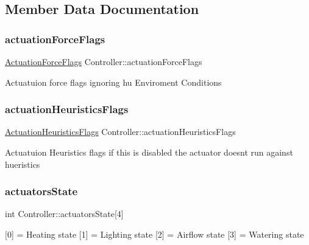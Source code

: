 \subsection{Member Data Documentation}
\mbox{\label{classController_a5af467109ecf31a0e63213ff9e5d0d72}} 
\subsubsection{\texorpdfstring{actuation\+Force\+Flags}{actuationForceFlags}}
{\footnotesize\ttfamily \hyperlink{structActuationForceFlags}{Actuation\+Force\+Flags} Controller\+::actuation\+Force\+Flags}

Actuatuion force flags ignoring hu Enviroment Conditions \mbox{\label{classController_ae3d5121f2fa076d362ac5d56feae17d2}} 
\subsubsection{\texorpdfstring{actuation\+Heuristics\+Flags}{actuationHeuristicsFlags}}
{\footnotesize\ttfamily \hyperlink{structActuationHeuristicsFlags}{Actuation\+Heuristics\+Flags} Controller\+::actuation\+Heuristics\+Flags}

Actuatuion Heuristics flags if this is disabled the actuator doesn\textquotesingle{}t run against hueristics \mbox{\label{classController_a23064d241b70e672c4c1d3db9671bd5e}} 
\subsubsection{\texorpdfstring{actuators\+State}{actuatorsState}}
{\footnotesize\ttfamily int Controller\+::actuators\+State\mbox{[}4\mbox{]}}

\mbox{[}0\mbox{]} = Heating state \mbox{[}1\mbox{]} = Lighting state \mbox{[}2\mbox{]} = Airflow state \mbox{[}3\mbox{]} = Watering state \mbox{\label{classController_ac99088334f56588243867ca1c18f9633}} 
